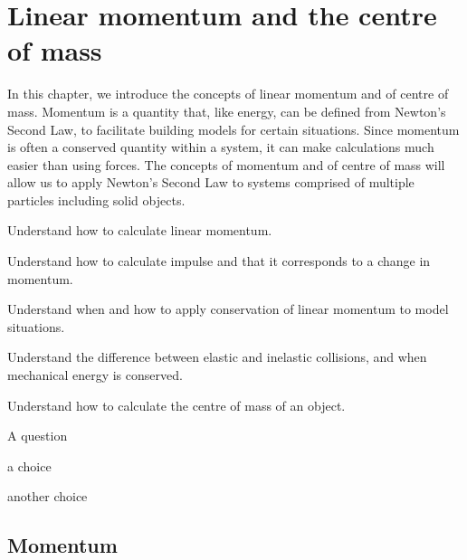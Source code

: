 
\chapter{Linear momentum and the centre of mass}
\label{chapter:momentumandcm}
In this chapter, we introduce the concepts of linear momentum and of centre of mass. Momentum is a quantity that, like energy, can be defined from Newton's Second Law, to facilitate building models for certain situations. Since momentum is often a conserved quantity within a system, it can make calculations much easier than using forces. The concepts of momentum and of centre of mass will allow us to apply Newton's Second Law to systems comprised of multiple particles including solid objects. 

\begin{learningObjectives}{
 \item Understand how to calculate linear momentum.
 \item Understand how to calculate impulse and that it corresponds to a change in momentum.
 \item Understand when and how to apply conservation of linear momentum to model situations.
 \item Understand the difference between elastic and inelastic collisions, and when mechanical energy is conserved.
 \item Understand how to calculate the centre of mass of an object.
}
\end{learningObjectives}

\begin{opening}
\begin{MCquestion}{A question}
\item a choice
\item another choice %
\end{MCquestion}
\end{opening}


\section{Momentum}
